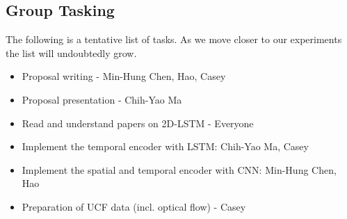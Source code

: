 \subsection*{Group Tasking}
The following is a tentative list of tasks. As we move closer to our experiments the list will undoubtedly grow. 
\begin{itemize}
\item Proposal writing - Min-Hung Chen, Hao, Casey
\item Proposal presentation - Chih-Yao Ma
\item Read and understand papers on 2D-LSTM - Everyone
\item Implement the temporal encoder with LSTM: Chih-Yao Ma, Casey
\item Implement the spatial and temporal encoder with CNN: Min-Hung Chen, Hao
\item Preparation of UCF data (incl. optical flow) - Casey
\end{itemize}

